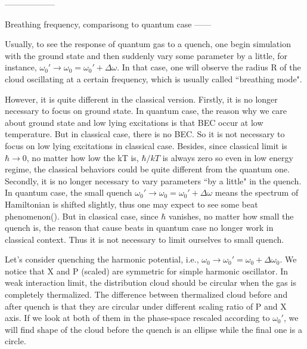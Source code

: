 \documentclass[aps,preprintnumbers,onecolumn,amsmath,amssymb,floatfix,pra]{revtex4-1}
\begin{document}


------------------

Breathing frequency, comparisong to quantum case ------ 

Usually, to see the response of quantum gas to a quench, one begin simulation with the ground state
and then suddenly vary some parameter by a little, for instance,
$\omega_0'\rightarrow\omega_0=\omega_0'+\Delta\omega$. In that case, one will observe the radius R
of the cloud oscillating at a certain frequency, which is usually called ``breathing mode".

However, it is quite different in the classical version. Firstly, it is no longer necessary to focus
on ground state. In quantum case, the reason why we care about ground state and low lying
excitations is that BEC occur at low temperature. But in classical case, there is no BEC. So it is
not necessary to focus on low lying excitations in classical case. Besides, since classical limit is
$\hbar\rightarrow 0$, no matter how low the kT is, $\hbar/kT$ is always zero so even in low energy
regime, the classical behaviors could be quite different from the quantum one. Secondly, it is no
longer necessary to vary parameters ``by a little" in the quench. In quantum case, the small quench
$\omega_0'\rightarrow\omega_0=\omega_0'+\Delta\omega$ means the spectrum of Hamiltonian is shifted
slightly, thus one may expect to see some beat phenomenon({\color{red}{?}}). But in classical case,
since $\hbar$ vanishes, no matter how small the quench is, the reason that cause beats in quantum
case no longer work in classical context. Thus it is not necessary to limit ourselves to small
quench.

Let's consider quenching the harmonic potential, i.e.,
$\omega_0\rightarrow\omega_0'=\omega_0+\Delta\omega_0$. We notice that X and P (scaled) are
symmetric for simple harmonic oscillator. In weak interaction limit, the distribution cloud should
be circular when the gas is completely thermalized. The difference between thermalized cloud before
and after quench is that they are circular under different scaling ratio of P and X axis. If we look
at both of them in the phase-space rescaled according to $\omega_0'$, we will find shape of the
cloud before the quench is an ellipse while the final one is a circle.
\end{document}

